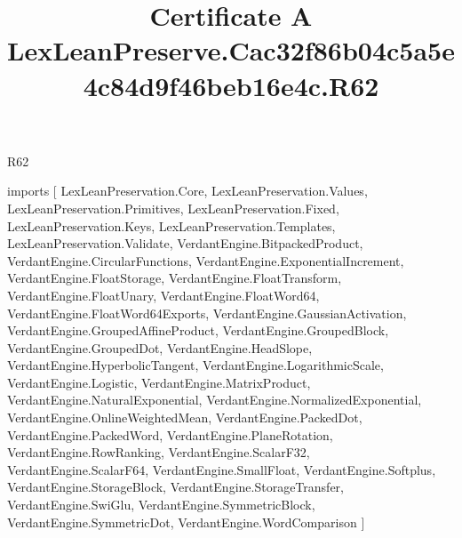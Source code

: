 \begin{lexlean}{R62}
\title{Certificate A LexLeanPreserve.Cac32f86b04c5a5e4c84d9f46beb16e4c.R62}
\begin{coremodule}
imports [
  LexLeanPreservation.Core,
  LexLeanPreservation.Values,
  LexLeanPreservation.Primitives,
  LexLeanPreservation.Fixed,
  LexLeanPreservation.Keys,
  LexLeanPreservation.Templates,
  LexLeanPreservation.Validate,
  VerdantEngine.BitpackedProduct,
  VerdantEngine.CircularFunctions,
  VerdantEngine.ExponentialIncrement,
  VerdantEngine.FloatStorage,
  VerdantEngine.FloatTransform,
  VerdantEngine.FloatUnary,
  VerdantEngine.FloatWord64,
  VerdantEngine.FloatWord64Exports,
  VerdantEngine.GaussianActivation,
  VerdantEngine.GroupedAffineProduct,
  VerdantEngine.GroupedBlock,
  VerdantEngine.GroupedDot,
  VerdantEngine.HeadSlope,
  VerdantEngine.HyperbolicTangent,
  VerdantEngine.LogarithmicScale,
  VerdantEngine.Logistic,
  VerdantEngine.MatrixProduct,
  VerdantEngine.NaturalExponential,
  VerdantEngine.NormalizedExponential,
  VerdantEngine.OnlineWeightedMean,
  VerdantEngine.PackedDot,
  VerdantEngine.PackedWord,
  VerdantEngine.PlaneRotation,
  VerdantEngine.RowRanking,
  VerdantEngine.ScalarF32,
  VerdantEngine.ScalarF64,
  VerdantEngine.SmallFloat,
  VerdantEngine.Softplus,
  VerdantEngine.StorageBlock,
  VerdantEngine.StorageTransfer,
  VerdantEngine.SwiGlu,
  VerdantEngine.SymmetricBlock,
  VerdantEngine.SymmetricDot,
  VerdantEngine.WordComparison
]


\end{coremodule}
\end{lexlean}
